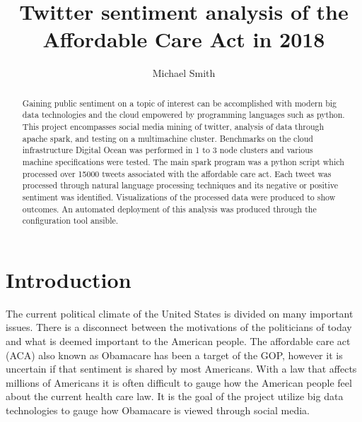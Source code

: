 
\title{Twitter sentiment analysis of the Affordable Care Act in 2018}


\author{Michael Smith}



\renewcommand{\shortauthors}{M. Smith}


\begin{abstract}
Gaining public sentiment on a topic of interest can be accomplished
with modern big data technologies and the cloud empowered by
programming languages such as python.  This project encompasses social
media mining of twitter, analysis of data through apache spark, and
testing on a multimachine cluster.  Benchmarks on the cloud
infrastructure Digital Ocean was performed in 1 to 3 node clusters and
various machine specifications were tested.  The main spark program
was a python script which processed over 15000 tweets associated with
the affordable care act.  Each tweet was processed through natural
language processing techniques and its negative or positive sentiment
was identified.  Visualizations of the processed data were produced to
show outcomes.  An automated deployment of this analysis was produced
through the configuration tool ansible.

\end{abstract}





\maketitle


\section{Introduction}

The current political climate of the United States is divided on many
important issues.  There is a disconnect between the motivations of
the politicians of today and what is deemed important to the American
people.  The affordable care act (ACA) also known as Obamacare has
been a target of the GOP, however it is uncertain if that sentiment is
shared by most Americans.  With a law that affects millions of
Americans it is often difficult to gauge how the American people feel
about the current health care law.  It is the goal of the project
utilize big data technologies to gauge how Obamacare is viewed through
social media.

